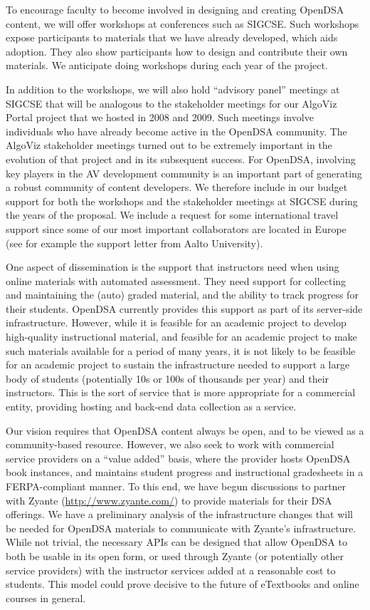 \documentclass[11pt]{article}
\begin{document}
\vspace{-\bigskipamount}
To encourage faculty to become involved in designing and creating
OpenDSA content, we will offer workshops at conferences such as
SIGCSE.
Such workshops expose participants to materials that we have already
developed, which aids adoption.
They also show participants how to design and contribute their own
materials.
We anticipate doing workshops during each year of the project.

In addition to the workshops, we will also hold ``advisory panel''
meetings at SIGCSE that will be analogous to the stakeholder meetings
for our AlgoViz Portal project that we hosted in 2008 and 2009.
Such meetings involve individuals who have already become active in
the OpenDSA community.
The AlgoViz stakeholder meetings turned out to be extremely important
in the evolution of that project and in its subsequent success.
For OpenDSA, involving key players in the AV development community is
an important part of generating a robust community of content
developers.
We therefore include in our budget support for both the workshops
and the stakeholder meetings at SIGCSE during the years of the
proposal.
We include a request for some international travel support
since some of our most important collaborators are located in Europe
(see for example the support letter from Aalto University).

One aspect of dissemination is the support that instructors need when
using online materials with automated assessment.
They need support for collecting and maintaining the (auto)
graded material, and the ability to track progress for their
students.
OpenDSA currently provides this support as part of its server-side
infrastructure.
However, while it is feasible for an academic project to
develop high-quality instructional material, and feasible
for an academic project to make such materials available for a period
of many years, it is not likely to be feasible for an academic project
to sustain the infrastructure needed to support a large body of
students (potentially 10s or 100s of thousands per year) and their
instructors.
This is the sort of service that is more appropriate for a commercial
entity, providing hosting and back-end data collection as a service.

Our vision requires that OpenDSA content always be open, and
to be viewed as a community-based resource.
However, we also seek to work with commercial service providers on a
``value added'' basis, where the provider hosts OpenDSA book
instances, and maintains student progress and instructional
gradesheets in a FERPA-compliant manner.
To this end, we have begun discussions to partner with Zyante
(\url{http://www.zyante.com/}) to provide materials for their DSA
offerings.
We have a preliminary analysis of the infrastructure changes
that will be needed for OpenDSA materials to communicate with
Zyante's infrastructure.
While not trivial, the necessary APIs can be designed that
allow OpenDSA to both be usable in its open form, or
used through Zyante (or potentially other service providers) with the
instructor services added at a reasonable cost to students.
This model could prove decisive to the future of eTextbooks and
online courses in general.
\end{document}
